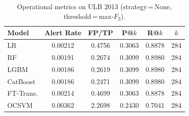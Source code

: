 \begin{table}[ht!]
\centering
\caption{Operational metrics on ULB 2013 (strategy\,=\,None, threshold\,=\,max-$F_2$).}
\label{tab:ops_ulb}
\begin{tabular}{l c c c c c}
\toprule
Model & Alert Rate & FP/TP & P@$k$ & R@$k$ & $k$ \\
\midrule
LR         & 0.00212 & 0.4756 & 0.3063 & 0.8878 & 284 \\
RF         & 0.00191 & 0.2674 & 0.3099 & 0.8980 & 284 \\
LGBM       & 0.00186 & 0.2619 & 0.3099 & 0.8980 & 284 \\
CatBoost   & 0.00186 & 0.2471 & 0.3099 & 0.8980 & 284 \\
FT-Trans.  & 0.00214 & 0.4699 & 0.3063 & 0.8878 & 284 \\
OCSVM      & 0.00362 & 2.2698 & 0.2430 & 0.7041 & 284 \\
\bottomrule
\end{tabular}
\end{table}